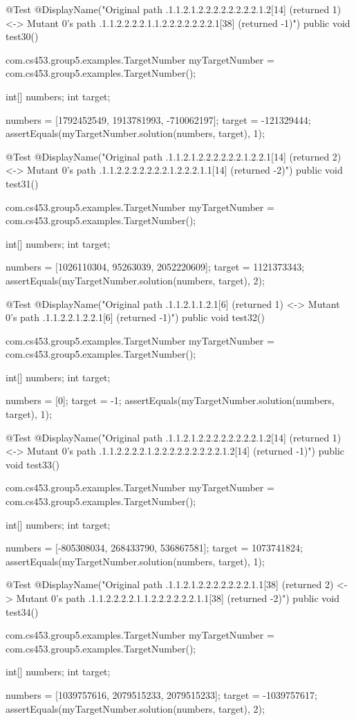 @Test
@DisplayName("Original path .1.1.2.1.2.2.2.2.2.2.2.2.1.2[14] (returned 1) <-> Mutant 0's path .1.1.2.2.2.2.1.1.2.2.2.2.2.2.2.1[38] (returned -1)")
public void test30() {
    com.cs453.group5.examples.TargetNumber myTargetNumber = com.cs453.group5.examples.TargetNumber();

    int[] numbers;
    int target;

    numbers = [1792452549, 1913781993, -710062197];
    target = -121329444;
    assertEquals(myTargetNumber.solution(numbers, target), 1);
}

@Test
@DisplayName("Original path .1.1.2.1.2.2.2.2.2.2.1.2.2.1[14] (returned 2) <-> Mutant 0's path .1.1.2.2.2.2.2.2.2.1.2.2.2.1.1[14] (returned -2)")
public void test31() {
    com.cs453.group5.examples.TargetNumber myTargetNumber = com.cs453.group5.examples.TargetNumber();

    int[] numbers;
    int target;

    numbers = [1026110304, 95263039, 2052220609];
    target = 1121373343;
    assertEquals(myTargetNumber.solution(numbers, target), 2);
}

@Test
@DisplayName("Original path .1.1.2.1.1.2.1[6] (returned 1) <-> Mutant 0's path .1.1.2.2.1.2.2.1[6] (returned -1)")
public void test32() {
    com.cs453.group5.examples.TargetNumber myTargetNumber = com.cs453.group5.examples.TargetNumber();

    int[] numbers;
    int target;

    numbers = [0];
    target = -1;
    assertEquals(myTargetNumber.solution(numbers, target), 1);
}

@Test
@DisplayName("Original path .1.1.2.1.2.2.2.2.2.2.2.2.1.2[14] (returned 1) <-> Mutant 0's path .1.1.2.2.2.2.1.2.2.2.2.2.2.2.2.2.1.2[14] (returned -1)")
public void test33() {
    com.cs453.group5.examples.TargetNumber myTargetNumber = com.cs453.group5.examples.TargetNumber();

    int[] numbers;
    int target;

    numbers = [-805308034, 268433790, 536867581];
    target = 1073741824;
    assertEquals(myTargetNumber.solution(numbers, target), 1);
}

@Test
@DisplayName("Original path .1.1.2.1.2.2.2.2.2.2.2.1.1[38] (returned 2) <-> Mutant 0's path .1.1.2.2.2.2.1.1.2.2.2.2.2.2.1.1[38] (returned -2)")
public void test34() {
    com.cs453.group5.examples.TargetNumber myTargetNumber = com.cs453.group5.examples.TargetNumber();

    int[] numbers;
    int target;

    numbers = [1039757616, 2079515233, 2079515233];
    target = -1039757617;
    assertEquals(myTargetNumber.solution(numbers, target), 2);
}

